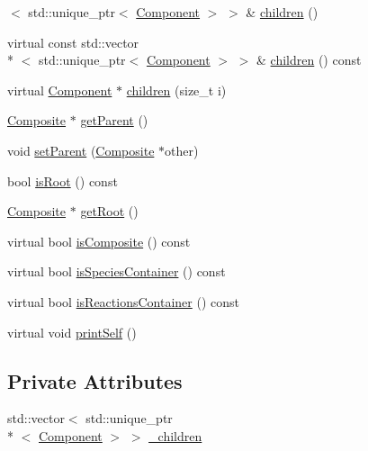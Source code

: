 \begin{DoxyCompactItemize}
$<$ std\-::unique\-\_\-ptr$<$ \hyperlink{classchem_1_1Component}{Component} $>$ $>$ \& \hyperlink{classchem_1_1Composite_af4fdad429dc7d8d5014961bbd18c8970}{children} ()
\item 
virtual const std\-::vector\\*
$<$ std\-::unique\-\_\-ptr$<$ \hyperlink{classchem_1_1Component}{Component} $>$ $>$ \& \hyperlink{classchem_1_1Composite_a9c66ed039e22fdafc90627db067fea4b}{children} () const 
\item 
virtual \hyperlink{classchem_1_1Component}{Component} $\ast$ \hyperlink{classchem_1_1Composite_adf797cd6faed6b5f42848c712fd9eb8a}{children} (size\-\_\-t i)
\item 
\hyperlink{classchem_1_1Composite}{Composite} $\ast$ \hyperlink{classchem_1_1Component_a32812270ee52f07ceae2194c56864fd6}{get\-Parent} ()
\item 
void \hyperlink{classchem_1_1Component_a1f4e4d1566f1d3026f1e2a14fa3dffd9}{set\-Parent} (\hyperlink{classchem_1_1Composite}{Composite} $\ast$other)
\item 
bool \hyperlink{classchem_1_1Component_a75cd13a0d884f82fcddd574de33fbfe6}{is\-Root} () const 
\item 
\hyperlink{classchem_1_1Composite}{Composite} $\ast$ \hyperlink{classchem_1_1Component_a7f1166f8fb4c9526cd1794ec3c2714f5}{get\-Root} ()
\item 
virtual bool \hyperlink{classchem_1_1Component_af2c73f75f937d457a55c1e0120833cb8}{is\-Composite} () const 
\item 
virtual bool \hyperlink{classchem_1_1Component_a3c0f652fe5b6910f07c046fe0190b7b5}{is\-Species\-Container} () const 
\item 
virtual bool \hyperlink{classchem_1_1Component_a8c79ee4335fadfcef56b14a62b742457}{is\-Reactions\-Container} () const 
\item 
virtual void \hyperlink{classchem_1_1Component_a778911b6f9505f1d8a39fc39e093974e}{print\-Self} ()
\end{DoxyCompactItemize}
\subsection*{Private Attributes}
\begin{DoxyCompactItemize}
\item 
std\-::vector$<$ std\-::unique\-\_\-ptr\\*
$<$ \hyperlink{classchem_1_1Component}{Component} $>$ $>$ \hyperlink{classchem_1_1Composite_a80fea5cefad1820315fbef6f8d7adf17}{\-\_\-children}
\end{DoxyCompactItemize}


